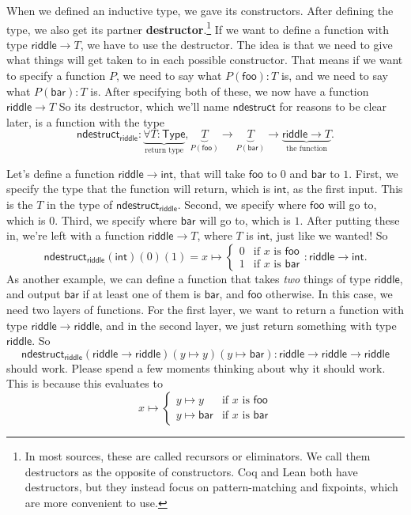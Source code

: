 \documentclass[11pt,paper=letter]{scrartcl}
\renewcommand{\sf}{\mathsf}
\newcommand{\type}{\mathsf{Type}}
\begin{document}
When we defined an inductive type, we gave its constructors. After defining the type, we also get its partner \textbf{destructor}.\footnote{In most sources, these are called recursors or eliminators. We call them destructors as the opposite of constructors. Coq and Lean both have destructors, but they instead focus on pattern-matching and fixpoints, which are more convenient to use.} If we want to define a function with type $\sf{riddle} \to T$, we have to use the destructor. The idea is that we need to give what things will get taken to in each possible constructor. That means if we want to specify a function $P$, we need to say what $P(\sf{foo}) : T$ is, and we need to say what $P(\sf{bar}) : T$ is. After specifying both of these, we now have a function $\sf{riddle} \to T$ So its destructor, which we'll name $\sf{ndestruct}$ for reasons to be clear later, is a function with the type \[
\sf{ndestruct}_{\sf{riddle}}:
\underbrace{\forall T: \type}_{\text{return type}},
\underbrace{T}_{P(\sf{foo})} \to
\underbrace{T}_{P(\sf{bar})} \to
\underbrace{\sf{riddle} \to T}_{\text{the function}}.
\]

Let's define a function $\sf{riddle} \to \sf{int}$, that will take $\sf{foo}$ to $0$ and $\sf{bar}$ to $1$. First, we specify the type that the function will return, which is $\sf{int}$, as the first input. This is the $T$ in the type of $\sf{ndestruct}_\sf{riddle}$. Second, we specify where $\sf{foo}$ will go to, which is $0$. Third, we specify where $\sf{bar}$ will go to, which is $1$. After putting these in, we're left with a function $\sf{riddle} \to T$, where $T$ is $\sf{int}$, just like we wanted! So \[
  \sf{ndestruct}_{\sf{riddle}}(\sf{int})(0)(1) = x \mapsto
  \begin{cases}
  0 & \text{if $x$ is }\sf{foo} \\
  1 & \text{if $x$ is }\sf{bar}
  \end{cases} : \sf{riddle} \to \sf{int}.
\]
As another example, we can define a function that takes \emph{two} things of type $\sf{riddle}$, and output $\sf{bar}$ if at least one of them is $\sf{bar}$, and $\sf{foo}$ otherwise. In this case, we need two layers of functions. For the first layer, we want to return a function with type $\sf{riddle} \to \sf{riddle}$, and in the second layer, we just return something with type $\sf{riddle}$. So \[
  \sf{ndestruct}_\sf{riddle}(
  \sf{riddle} \to \sf{riddle})(
  y \mapsto y)(
  y \mapsto \sf{bar}
  ) : \sf{riddle} \to \sf{riddle} \to \sf{riddle}
\]
should work. Please spend a few moments thinking about why it should work. This is because this evaluates to \[
  x \mapsto
  \begin{cases}
  y \mapsto y & \text{if $x$ is }\sf{foo} \\
  y \mapsto \sf{bar} & \text{if $x$ is }\sf{bar}
  \end{cases}
\]
\end{document}
